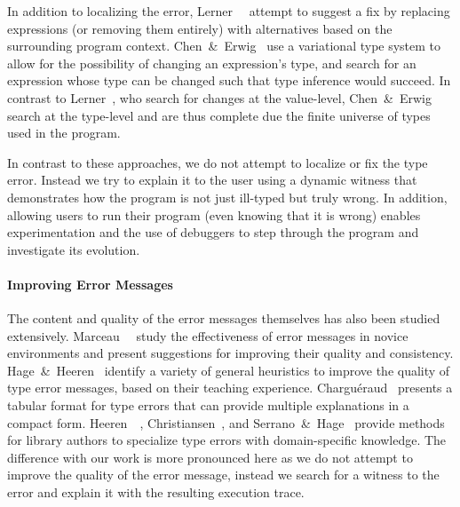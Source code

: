 In addition to localizing the error, Lerner~\etal~ attempt to
suggest a fix by replacing expressions (or removing them entirely) with
alternatives based on the surrounding program context.
%
Chen~\&~Erwig~ use a variational type system to allow for the
possibility of changing an expression's type, and search for an
expression whose type can be changed such that type inference would
succeed.
%
%
In contrast to Lerner~\etal, who search for changes at the value-level,
Chen~\&~Erwig search at the type-level and are thus complete due the finite
universe of types used in the program.
%
%

In contrast to these approaches, we do not attempt to localize or fix
the type error. Instead we try to explain it to the user using a
dynamic witness that demonstrates how the program is not just
ill-typed but truly wrong. In addition, allowing users to run their
program (even knowing that it is wrong)
enables experimentation and the
use of debuggers to step through the program and investigate its
evolution.

\paragraph{Improving Error Messages}
%
The content and quality of the error messages themselves has also been
studied extensively.
%
Marceau~\etal~ study the
effectiveness of error messages in novice environments and present
suggestions for improving their quality and consistency.
%
Hage~\&~Heeren~ identify a variety of general
heuristics to improve the quality of type error messages, based on their
teaching experience.
%
Chargu{\'e}raud~ presents a tabular format
for type errors that can provide multiple explanations in a compact form.
%
Heeren~\etal~,
Christiansen~, and
Serrano~\&~Hage~
provide methods for library authors to specialize
type errors with domain-specific knowledge.
%
The difference with our work is more pronounced here as we do not
attempt to improve the quality of the error message, instead we search
for a witness to the error and explain it with the resulting execution
trace.
%



